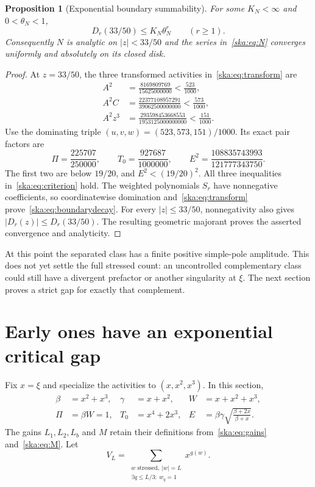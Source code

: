 \documentclass[11pt,letterpaper]{article}
\newtheorem{proposition}[theorem]{Proposition}
\theoremstyle{definition}
\begin{document}
\begin{proposition}[Exponential boundary summability]\label{ska:prop:numerator}
For some $K_N<\infty$ and $0<\theta_N<1$,
\begin{equation}\label{ska:eq:boundarydecay}
D_r(33/50)\le K_N\theta_N^r\qquad(r\ge1).
\end{equation}
Consequently $N$ is analytic on $|z|<33/50$ and the series in~\eqref{ska:eq:N} converges uniformly and absolutely on its closed disk.
\end{proposition}
\begin{proof}
At $z=33/50$, the three transformed activities in~\eqref{ska:eq:transform} are
\begin{align}
A^2&=\frac{8169809769}{15625000000}<\frac{523}{1000},\label{ska:eq:actcert1}\\
A^2C&=\frac{22377108957291}{39062500000000}<\frac{573}{1000},\label{ska:eq:actcert2}\\
A^2z^3&=\frac{293598453668553}{1953125000000000}<\frac{151}{1000}.\label{ska:eq:actcert3}
\end{align}
Use the dominating triple $(u,v,w)=(523,573,151)/1000$. Its exact pair factors are
\begin{equation}\label{ska:eq:triplecert}
\Pi=\frac{225707}{250000},\qquad
T_0=\frac{927687}{1000000},\qquad
E^2=\frac{108835743993}{121777343750}.
\end{equation}
The first two are below $19/20$, and $E^2<(19/20)^2$. All three inequalities in~\eqref{ska:eq:criterion} hold. The weighted polynomials $S_r$ have nonnegative coefficients, so coordinatewise domination and~\eqref{ska:eq:transform} prove~\eqref{ska:eq:boundarydecay}. For every $|z|\le33/50$, nonnegativity also gives $|D_r(z)|\le D_r(33/50)$. The resulting geometric majorant proves the asserted convergence and analyticity.
\end{proof}

At this point the separated class has a finite positive simple-pole amplitude. This does not yet settle the full stressed count: an uncontrolled complementary class could still have a divergent prefactor or another singularity at $\xi$. The next section proves a strict gap for exactly that complement.

\section{Early ones have an exponential critical gap}\label{ska:sec:early}
Fix $x=\xi$ and specialize the activities to $(x,x^2,x^3)$. In this section,
\begin{align}
\beta&=x^2+x^3,&\gamma&=x+x^2,&W&=x+x^2+x^3,\label{ska:eq:criticalletters}\\
\Pi&=\beta W=1,&T_0&=x^4+2x^3,&E&=\beta\gamma\sqrt{\frac{\beta+2x}{\beta+x}}.\label{ska:eq:criticalfactors}
\end{align}
The gains $L_1,L_2,L_b$ and $M$ retain their definitions from~\eqref{ska:eq:gains} and~\eqref{ska:eq:M}. Let
\begin{equation}\label{ska:eq:VL}
V_L=\sum_{\substack{w\text{ stressed},\ |w|=L\\
\exists q\le L/3:\ w_q=1}}x^{g(w)}.
\end{equation}
\end{document}

